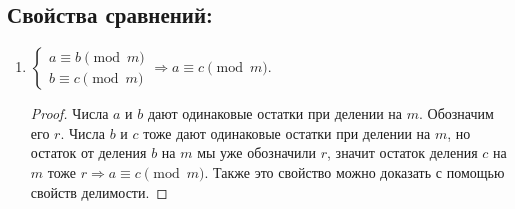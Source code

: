 \documentclass[russian]{lecture-notes}
\begin{document}
\subsection{Свойства сравнений:}
\label{sec:prop}
\begin{enumerate}
	\item 	$\begin{cases}
				a \equiv b \pmod m \\
				b \equiv c \pmod m
			\end{cases} \Rightarrow a \equiv c \pmod m$.
			\label{sravn:1}
	\begin{proof}
		Числа $a$ и $b$ дают одинаковые остатки при делении на $m$. Обозначим его $r$. Числа $b$ и $c$ тоже дают одинаковые остатки при делении на $m$, но остаток от деления $b$ на $m$ мы уже обозначили $r$, значит остаток деления $c$ на $m$ тоже $r \Rightarrow a \equiv c \pmod m$. Также это свойство можно доказать с помощью свойств делимости.
		

\end{proof}
\end{enumerate}
\end{document}
